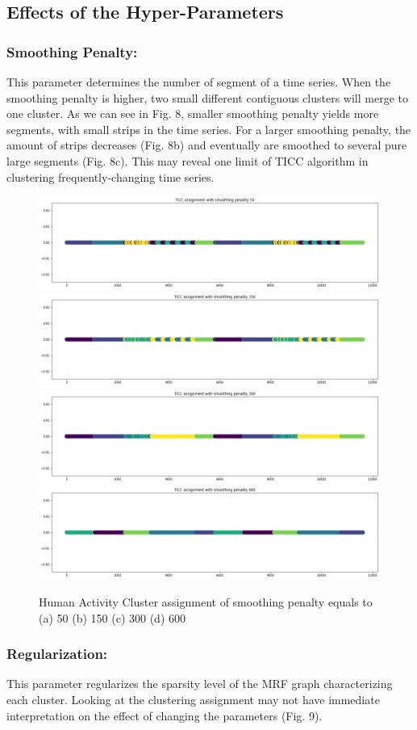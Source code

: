 \documentclass{llncs}
\begin{document}
\subsection{Effects of the Hyper-Parameters}

\subsubsection{Smoothing Penalty:} This parameter determines the number of segment of a time series. When the smoothing penalty is higher, two small different contiguous clusters will merge to one cluster. As we can see in Fig. 8, smaller smoothing penalty yields more segments, with small strips in the time series. For a larger smoothing penalty, the amount of strips decreases (Fig. 8b) and eventually are smoothed to several pure large segments (Fig. 8c). This may reveal one limit of TICC algorithm in clustering frequently-changing time series.

\begin{figure}[H]
    \centering
    \includegraphics[width=.5\textwidth]{50Penalty.png}\hfill
    \includegraphics[width=.5\textwidth]{150Penalty.png}
    \includegraphics[width=.5\textwidth]{300Penalty.png}\hfill
    \includegraphics[width=.5\textwidth]{600Penalty.png}
    \caption{Human Activity Cluster assignment of smoothing penalty equals to (a) 50 (b) 150 (c) 300 (d) 600}
    \label{fig:penalty}
\end{figure}

\subsubsection{Regularization:} This parameter regularizes
the sparsity level of the MRF graph characterizing each cluster. Looking at the clustering assignment may not have immediate interpretation on the effect of changing the parameters (Fig. 9). 
\end{document}
